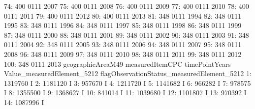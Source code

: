 \documentclass[nojss]{jss}
\begin{document}
\begin{Schunk}
\begin{Soutput}
 74:               400            0111           2007
 75:               400            0111           2008
 76:               400            0111           2009
 77:               400            0111           2010
 78:               400            0111           2011
 79:               400            0111           2012
 80:               400            0111           2013
 81:               348            0111           1994
 82:               348            0111           1995
 83:               348            0111           1996
 84:               348            0111           1997
 85:               348            0111           1998
 86:               348            0111           1999
 87:               348            0111           2000
 88:               348            0111           2001
 89:               348            0111           2002
 90:               348            0111           2003
 91:               348            0111           2004
 92:               348            0111           2005
 93:               348            0111           2006
 94:               348            0111           2007
 95:               348            0111           2008
 96:               348            0111           2009
 97:               348            0111           2010
 98:               348            0111           2011
 99:               348            0111           2012
100:               348            0111           2013
     geographicAreaM49 measuredItemCPC timePointYears
     Value_measuredElement_5212 flagObservationStatus_measuredElement_5212
  1:                    1319760                                          I
  2:                    1181120                                          I
  3:                     957670                                          I
  4:                    1211720                                          I
  5:                    1141682                                          I
  6:                     966282                                          I
  7:                     978575                                          I
  8:                    1355500                                          I
  9:                    1368627                                          I
 10:                     841014                                          I
 11:                    1039680                                          I
 12:                    1101807                                          I
 13:                     970392                                          I
 14:                    1087996                                          I

\end{Soutput}
\end{Schunk}
\end{document}
